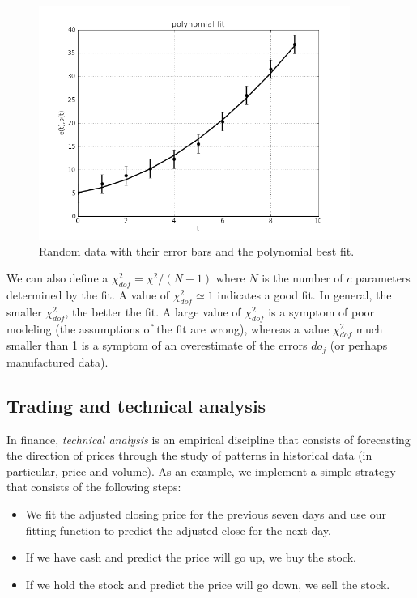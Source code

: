 \documentclass[justified,sixbynine]{tufte-book}
\theoremstyle{plain}%
\theoremstyle{definition}
\theoremstyle{remark}
\begin{document}
\begin{fullwidth}
\begin{figure}[ht]
\centering\includegraphics[width=4in]{images/polynomialfit.png}
\caption{Random data with their error bars and the polynomial best fit.\label{fit}}
\end{figure}

We can also define a $\chi^2_{dof} = \chi^2/(N-1)$ where $N$ is the number of $c$ parameters determined by the fit. A value of $\chi^2_{dof} \simeq 1$ indicates a good fit. In general, the smaller $\chi^2_{dof}$, the better the fit. A large value of $\chi^2_{dof}$ is a symptom of poor modeling (the assumptions of the fit are wrong), whereas a value $\chi^2_{dof}$ much smaller than 1 is a symptom of an overestimate of the errors $do_j$ (or perhaps manufactured data).

\goodbreak\subsection{Trading and technical analysis}


In finance, {\it technical analysis} is an empirical discipline that consists of forecasting the direction of prices through the study of patterns in historical data (in particular, price and volume). As an example, we implement a simple strategy that consists of the following steps:

\begin{itemize}
\item We fit the adjusted closing price for the previous seven days and use our fitting function to predict the adjusted close for the next day.
\item If we have cash and predict the price will go up, we buy the stock.
\item If we hold the stock and predict the price will go down, we sell the stock.
\end{itemize}


\end{fullwidth}
\end{document}
